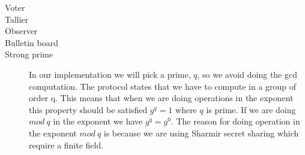 \begin{description}
    \item[Voter]
    \item[Tallier]
    \item[Observer]
    \item[Bulletin board]

    \item[Strong prime] In our implementation we will pick a prime, \begin{math}q\end{math}, so we avoid doing the gcd computation. The protocol states that we have to compute in a group of order q. This means that when we are doing operations in the exponent this property should be satisfied \begin{math}g^q=1\end{math} where \begin{math}q\end{math} is prime. If we are doing \begin{math}mod \ q \end{math} in the exponent we have \begin{math}g^q=g^0\end{math}. The reason for doing operation in the exponent \begin{math}mod \ q\end{math} is because we are using Sharmir secret sharing which require a finite field.\\
    

\end{description}
